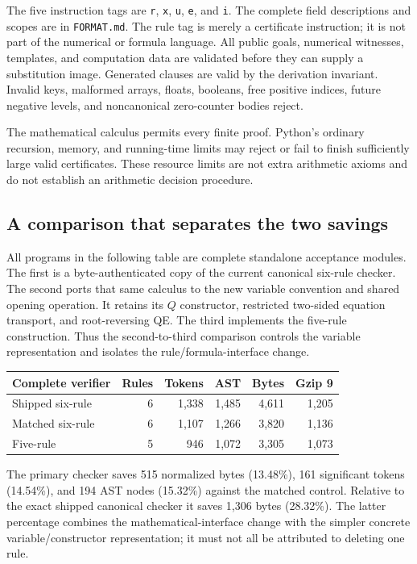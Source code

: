 \documentclass[11pt,letterpaper]{article}
\theoremstyle{definition}\newtheorem{definition}[theorem]{Definition}
\newcommand{\file}[1]{\texttt{\small\nolinkurl{#1}}}
\begin{document}
The five instruction tags are \file{r}, \file{x}, \file{u}, \file{e}, and \file{i}. The complete field descriptions and scopes are in \file{FORMAT.md}. The rule tag is merely a certificate instruction; it is not part of the numerical or formula language. All public goals, numerical witnesses, templates, and computation data are validated before they can supply a substitution image. Generated clauses are valid by the derivation invariant. Invalid keys, malformed arrays, floats, booleans, free positive indices, future negative levels, and noncanonical zero-counter bodies reject.

The mathematical calculus permits every finite proof. Python's ordinary recursion, memory, and running-time limits may reject or fail to finish sufficiently large valid certificates. These resource limits are not extra arithmetic axioms and do not establish an arithmetic decision procedure.

\subsection{A comparison that separates the two savings}
All programs in the following table are complete standalone acceptance modules. The first is a byte-authenticated copy of the current canonical six-rule checker. The second ports that same calculus to the new variable convention and shared opening operation. It retains its $Q$ constructor, restricted two-sided equation transport, and root-reversing QE. The third implements the five-rule construction. Thus the second-to-third comparison controls the variable representation and isolates the rule/formula-interface change.

\begin{center}\small
\begin{tabular}{lrrrrr}\toprule
Complete verifier & Rules & Tokens & AST & Bytes & Gzip 9\\\midrule
Shipped six-rule & 6 & 1,338 & 1,485 & 4,611 & 1,205\\
Matched six-rule & 6 & 1,107 & 1,266 & 3,820 & 1,136\\
Five-rule & 5 & 946 & 1,072 & 3,305 & 1,073\\
\bottomrule\end{tabular}
\end{center}


The primary checker saves 515 normalized bytes (13.48\%), 161 significant tokens (14.54\%), and 194 AST nodes (15.32\%) against the matched control. Relative to the exact shipped canonical checker it saves 1,306 bytes (28.32\%). The latter percentage combines the mathematical-interface change with the simpler concrete variable/constructor representation; it must not all be attributed to deleting one rule.
\end{document}

